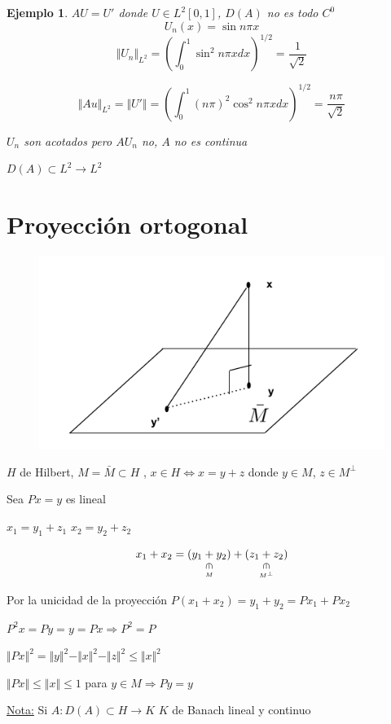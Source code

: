 \documentclass[a4paper,10pt]{book}
\newtheorem{ejemplo}{Ejemplo}
\newcommand{\rotin}{\mathbin{\rotatebox[origin=c]{270}{$\in$}}}
\begin{document}
\begin{ejemplo}
    $A U = U'$  donde $U \in L^2[0,1] $, $D(A)$ no es todo $C^0$ 
    \[
    U_n(x)= \sin n \pi x
    \]
    \[
    \Vert U_n\Vert_{L^2} = \left(  \int_0^1 \sin^2 n\pi x dx \right)^{1/2}= \frac{1}{\sqrt{2}}
    \]

    \[
    \Vert Au \Vert_{L^2} =\Vert U'\Vert = \left( \int_0^1 (n\pi)^2 \cos^2 n\pi x dx \right)^{1/2} = \frac{n\pi}{\sqrt{2}}
    \]

    $U_n$ son acotados pero $AU_n$ no, $A$ no es continua

    $D(A)\subset L^2 \rightarrow L^2$

\end{ejemplo}

\section{Proyección ortogonal}

\begin{figure}[H]
    \centering
    \includegraphics[width=0.5\linewidth]{Screen Shot 2024-03-03 at 06.55.16.png}
    \caption{}
    \label{fig:4}
\end{figure}

$H$ de  Hilbert, $M= \bar{M}\subset H$ , $x\in H \Leftrightarrow x= y + z$ donde $y\in M$, $z\in M^{\perp}$

Sea $Px = y $ es lineal

$x_1= y_1+ z_1$
$x_2 = y_2 + z_2 $

\[ 
x_1+x_2 = \underset{\underset{M}{\rotin}}{(y_1+y_2)} +\underset{\underset{M^{\perp}}{\rotin}}{(z_1+z_2)} 
\]

Por la unicidad de la proyección $P(x_1+x_2) = y_1+y_2= Px_1+Px_2$

$P^2x =P y = y = Px \Rightarrow P^2 = P$

$\Vert Px\Vert^2 = \Vert y\Vert^2 -\Vert x\Vert^2-\Vert z\Vert^2 \leq \Vert x\Vert^2$

$\Vert Px \Vert \leq \Vert x\Vert \leq 1$ para $y\in M \Rightarrow Py=y$


\underline{Nota:} Si $A: D(A)\subset H \rightarrow K $ $K$ de Banach lineal y continuo
\end{document}
